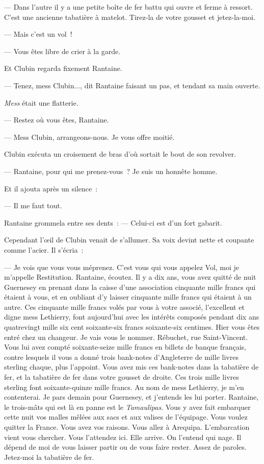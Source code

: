 \documentclass[french,twoside]{book} %
\begin{document}
— Dans l’autre il y a une petite boîte de fer battu qui ouvre et ferme à ressort. C’est une ancienne tabatière à matelot. Tirez-la de votre gousset et jetez-la-moi.\par
— Mais c’est un vol !\par
— Vous êtes libre de crier à la garde.\par
Et Clubin regarda fixement Rantaine.\par
— Tenez, mess Clubin..., dit Rantaine faisant un pas, et tendant sa main ouverte.\par
\emph{Mess} était une flatterie.\par
— Restez où vous êtes, Rantaine.\par
— Mess Clubin, arrangeons-nous. Je vous offre moitié.\par
Clubin exécuta un croisement de bras d’où sortait le bout de son revolver.\par
— Rantaine, pour qui me prenez-vous ? Je suis un honnête homme.\par
Et il ajouta après un silence :\par
— Il me faut tout.\par
Rantaine grommela entre ses dents : — Celui-ci est d’un fort gabarit.\par
Cependant l’œil de Clubin venait de s’allumer. Sa voix devint nette et coupante comme l’acier. Il s’écria :\par
— Je vois que vous vous méprenez. C’est vous qui vous appelez Vol, moi je m’appelle Restitution. Rantaine, écoutez. Il y a dix ans, vous avez quitté de nuit  Guernesey en prenant dans la caisse d’une association cinquante mille francs qui étaient à vous, et en oubliant d’y laisser cinquante mille francs qui étaient à un autre. Ces cinquante mille francs volés par vous à votre associé, l’excellent et digne mess Lethierry, font aujourd’hui avec les intérêts composés pendant dix ans quatrevingt mille six cent soixante-six francs soixante-six centimes. Hier vous êtes entré chez un changeur. Je vais vous le nommer. Rébuchet, rue Saint-Vincent. Vous lui avez compté soixante-seize mille francs en billets de banque français, contre lesquels il vous a donné trois bank-notes d’Angleterre de mille livres sterling chaque, plus l’appoint. Vous avez mis ces bank-notes dans la tabatière de fer, et la tabatière de fer dans votre gousset de droite. Ces trois mille livres sterling font soixante-quinze mille francs. Au nom de mess Lethierry, je m’en contenterai. Je pars demain pour Guernesey, et j’entends les lui porter. Rantaine, le trois-mâts qui est là en panne est le \emph{Tamaulipas}. Vous y avez fait embarquer cette nuit vos malles mêlées aux sacs et aux valises de l’équipage. Vous voulez quitter la France. Vous avez vos raisons. Vous allez à Arequipa. L’embarcation vient vous chercher. Vous l’attendez ici. Elle arrive. On l’entend qui nage. Il dépend de moi de vous laisser partir ou de vous faire rester. Assez de paroles. Jetez-moi la tabatière de fer.\par
\end{document}
